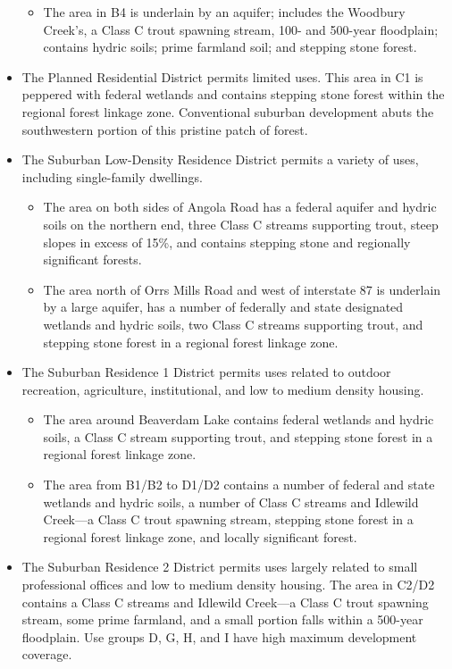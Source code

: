 \begin{itemize}
\begin{itemize}
        \item The area in B4 is underlain by an aquifer; includes the Woodbury Creek’s, a Class C trout spawning stream, 100- and 500-year floodplain; contains hydric soils; prime farmland soil; and stepping stone forest.
        \end{itemize}
    \item The Planned Residential District permits limited uses. This area in C1 is peppered with federal wetlands and contains stepping stone forest within the regional forest linkage zone. Conventional suburban development abuts the southwestern portion of this pristine patch of forest.
    \item The Suburban Low-Density Residence District permits a variety of uses, including single-family dwellings.
    \begin{itemize}
        \item The area on both sides of Angola Road has a federal aquifer and hydric soils on the northern end, three Class C streams supporting trout, steep slopes in excess of 15\%, and contains stepping stone and regionally significant forests.
        \item The area north of Orrs Mills Road and west of interstate 87 is underlain by a large aquifer, has a number of federally and state designated wetlands and hydric soils, two Class C streams supporting trout, and stepping stone forest in a regional forest linkage zone.
        \end{itemize}
    \item The Suburban Residence 1 District permits uses related to outdoor recreation, agriculture, institutional, and low to medium density housing.
    \begin{itemize}
        \item The area around Beaverdam Lake contains federal wetlands and hydric soils, a Class C stream supporting trout, and stepping stone forest in a regional forest linkage zone.
        \item The area from B1/B2 to D1/D2 contains a number of federal and state wetlands and hydric soils, a number of Class C streams and Idlewild Creek—a Class C trout spawning stream, stepping stone forest in a regional forest linkage zone, and locally significant forest.
        \end{itemize}
    \item The Suburban Residence 2 District permits uses largely related to small professional offices and low to medium density housing. The area in C2/D2 contains a Class C streams and Idlewild Creek—a Class C trout spawning stream, some prime farmland, and a small portion falls within a 500-year floodplain. Use groups D, G, H, and I have high maximum development coverage. 

\end{itemize}
